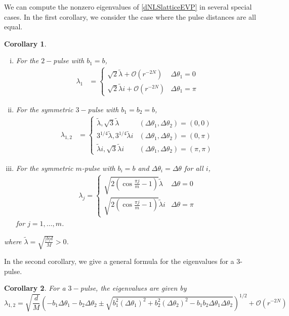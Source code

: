 \documentclass[12pt]{article}
\newtheorem{corollary}{Corollary}
\begin{document}
We can compute the nonzero eigenvalues of \eqref{dNLSlatticeEVP} in several special cases. In the first corollary, we consider the case where the pulse distances are all equal.

\begin{corollary}\label{dNLSeigcorr}\[\]
\begin{enumerate}[(i)]
\item For the $2-$pulse with $b_1 = b$,
\begin{align*}
\lambda_1 &= 
\begin{cases}
\sqrt{2}\tilde{\lambda}  + \mathcal{O}(r^{-2N}) & \Delta\theta_1 = 0 \\
\sqrt{2}\tilde{\lambda} i + \mathcal{O}(r^{-2N}) & \Delta\theta_1 = \pi
\end{cases}
\end{align*}
\item For the symmetric $3-$pulse with $b_1 = b_2 = b$,
\begin{align*}
\lambda_{1, 2} &= \begin{cases}
\tilde{\lambda}, \sqrt{3} \tilde{\lambda} & (\Delta\theta_1, \Delta\theta_2) = (0, 0) \\
3^{1/4}\tilde{\lambda}, 3^{1/4}\tilde{\lambda}i & (\Delta\theta_1, \Delta\theta_2) = (0, \pi) \\
\tilde{\lambda}i, \sqrt{3} \tilde{\lambda}i & (\Delta\theta_1, \Delta\theta_2) = (\pi, \pi)
\end{cases}
\end{align*}
\item For the symmetric $m$-pulse with $b_i = b$ and $\Delta\theta_i = \Delta\theta$ for all $i$,
\begin{align*}
\lambda_j = \begin{cases}
\sqrt{2\left( \cos\frac{\pi j}{m} - 1 \right)}\tilde{\lambda} & \Delta\theta = 0 \\
\sqrt{2\left( \cos\frac{\pi j}{m} - 1 \right)}\tilde{\lambda}i & \Delta\theta = \pi
\end{cases}
\end{align*}
for $j = 1, \dots, m$.
\end{enumerate}
where $\tilde{\lambda} = \sqrt{\frac{|b|d}{M}} > 0$.
\end{corollary}

In the second corollary, we give a general formula for the eigenvalues for a 3-pulse.

\begin{corollary}\label{dNLSeigcorr2}
For a $3-$pulse, the eigenvalues are given by 
\[
\lambda_{1,2} = \sqrt{\frac{d}{M}}
\left( -b_1\Delta\theta_1 - b_2\Delta\theta_2 \pm
\sqrt{b_1^2(\Delta\theta_1)^2 + b_2^2(\Delta\theta_2)^2 - b_1 b_2\Delta\theta_1 \Delta\theta_2} \right)^{1/2} + \mathcal{O}(r^{-2N})
\]
\end{corollary}
\end{document}
